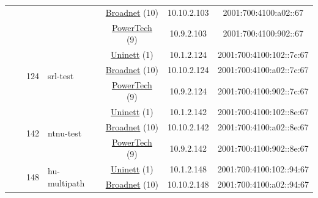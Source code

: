 \begin{small}
\begin{center}
\begin{longtable}{|c|c|c|c|c|c|c|c|}
  &  & \multicolumn{2}{|c|}{} & \multicolumn{2}{|c|}{\tiny{\href{https://www.broadnet.no}{Broadnet} (10)}} & \tiny{10.10.2.103} & \tiny{2001:700:4100:a02::67} \\* \cline{5-5}\cline{6-6}\cline{7-7}\cline{8-8}
  &  & \multicolumn{2}{|c|}{} & \multicolumn{2}{|c|}{\tiny{\href{http://www.powertech.no}{PowerTech} (9)}} & \tiny{10.9.2.103} & \tiny{2001:700:4100:902::67} \\* \cline{3-3}\cline{4-4}\cline{5-5}\cline{6-6}\cline{7-7}\cline{8-8}
  &  & \multirow{3}{*}{\tiny{124}} & \multicolumn{1}{|l|}{\multirow{3}{*}{\tiny{srl-test}}} & \multicolumn{2}{|c|}{\tiny{\href{https://www.uninett.no}{Uninett} (1)}} & \tiny{10.1.2.124} & \tiny{2001:700:4100:102::7c:67} \\* \cline{5-5}\cline{6-6}\cline{7-7}\cline{8-8}
  &  &  &  & \multicolumn{2}{|c|}{\tiny{\href{https://www.broadnet.no}{Broadnet} (10)}} & \tiny{10.10.2.124} & \tiny{2001:700:4100:a02::7c:67} \\* \cline{5-5}\cline{6-6}\cline{7-7}\cline{8-8}
  &  &  &  & \multicolumn{2}{|c|}{\tiny{\href{http://www.powertech.no}{PowerTech} (9)}} & \tiny{10.9.2.124} & \tiny{2001:700:4100:902::7c:67} \\* \cline{3-3}\cline{4-4}\cline{5-5}\cline{6-6}\cline{7-7}\cline{8-8}
  &  & \multirow{3}{*}{\tiny{142}} & \multicolumn{1}{|l|}{\multirow{3}{*}{\tiny{ntnu-test}}} & \multicolumn{2}{|c|}{\tiny{\href{https://www.uninett.no}{Uninett} (1)}} & \tiny{10.1.2.142} & \tiny{2001:700:4100:102::8e:67} \\* \cline{5-5}\cline{6-6}\cline{7-7}\cline{8-8}
  &  &  &  & \multicolumn{2}{|c|}{\tiny{\href{https://www.broadnet.no}{Broadnet} (10)}} & \tiny{10.10.2.142} & \tiny{2001:700:4100:a02::8e:67} \\* \cline{5-5}\cline{6-6}\cline{7-7}\cline{8-8}
  &  &  &  & \multicolumn{2}{|c|}{\tiny{\href{http://www.powertech.no}{PowerTech} (9)}} & \tiny{10.9.2.142} & \tiny{2001:700:4100:902::8e:67} \\* \cline{3-3}\cline{4-4}\cline{5-5}\cline{6-6}\cline{7-7}\cline{8-8}
  &  & \multirow{3}{*}{\tiny{148}} & \multicolumn{1}{|l|}{\multirow{3}{*}{\tiny{hu-multipath}}} & \multicolumn{2}{|c|}{\tiny{\href{https://www.uninett.no}{Uninett} (1)}} & \tiny{10.1.2.148} & \tiny{2001:700:4100:102::94:67} \\* \cline{5-5}\cline{6-6}\cline{7-7}\cline{8-8}
  &  &  &  & \multicolumn{2}{|c|}{\tiny{\href{https://www.broadnet.no}{Broadnet} (10)}} & \tiny{10.10.2.148} & \tiny{2001:700:4100:a02::94:67} \\* \cline{5-5}\cline{6-6}\cline{7-7}\cline{8-8}

\end{longtable}
\end{center}
\end{small}

